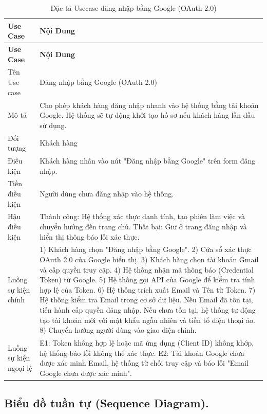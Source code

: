 \documentclass[../BTL.tex]{subfiles}
\begin{document}
\begin{longtable}{|p{}|p{}|}
\caption{Đặc tả Usecase đăng nhập bằng Google (OAuth 2.0)}\label{tab:usecase-dang-nhap-google}\\
\hline
\textbf{Use Case} & \textbf{Nội Dung} \\
\hline
\endfirsthead
\hline
\textbf{Use Case} & \textbf{Nội Dung} \\
\hline
\endhead
Tên Use case & Đăng nhập bằng Google (OAuth 2.0) \\
\hline
Mô tả & Cho phép khách hàng đăng nhập nhanh vào hệ thống bằng tài khoản Google. Hệ thống sẽ tự động khởi tạo hồ sơ nếu khách hàng lần đầu sử dụng. \\
\hline
Đối tượng & Khách hàng \\
\hline
Điều kiện & Khách hàng nhấn vào nút "Đăng nhập bằng Google" trên form đăng nhập. \\
\hline
Tiền điều kiện & Người dùng chưa đăng nhập vào hệ thống. \\
\hline
Hậu điều kiện & Thành công: Hệ thống xác thực danh tính, tạo phiên làm việc và chuyển hướng đến trang chủ. Thất bại: Giữ ở trang đăng nhập và hiển thị thông báo lỗi xác thực. \\
\hline
Luồng sự kiện chính & 1) Khách hàng chọn "Đăng nhập bằng Google". 2) Cửa sổ xác thực OAuth 2.0 của Google hiển thị. 3) Khách hàng chọn tài khoản Gmail và cấp quyền truy cập. 4) Hệ thống nhận mã thông báo (Credential Token) từ Google. 5) Hệ thống gọi API của Google để kiểm tra tính hợp lệ của Token. 6) Hệ thống trích xuất Email và Tên từ Token. 7) Hệ thống kiểm tra Email trong cơ sở dữ liệu. Nếu Email đã tồn tại, tiến hành cấp quyền đăng nhập. Nếu chưa tồn tại, hệ thống tự động tạo tài khoản mới với mật khẩu ngẫu nhiên và tiền tố điện thoại ảo. 8) Chuyển hướng người dùng vào giao diện chính. \\
\hline
Luồng sự kiện ngoại lệ & E1: Token không hợp lệ hoặc mã ứng dụng (Client ID) không khớp, hệ thống báo lỗi không thể xác thực. E2: Tài khoản Google chưa được xác minh Email, hệ thống từ chối truy cập và báo lỗi "Email Google chưa được xác minh". \\\hline
\end{longtable}

\subsection{Biểu đồ tuần tự (Sequence Diagram).}
\end{document}
